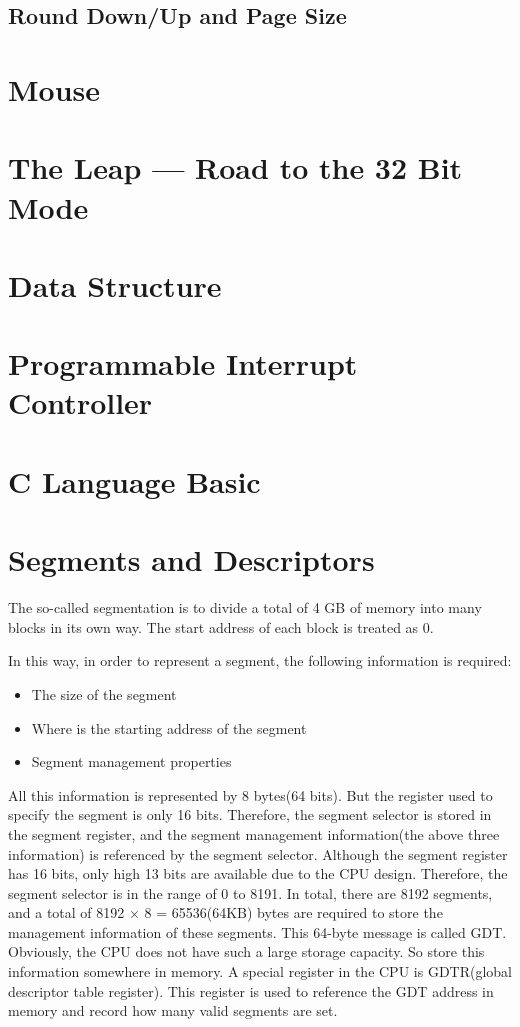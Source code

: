 \documentclass{swfcthesis}
\begin{document}
\subsection{Round Down/Up and Page Size}
\label{sec:round-downup-page}


\section{Mouse}
\label{sec:mouse}

\section{The Leap --- Road to the 32 Bit Mode}
\label{sec:leap-road-32}

\section{Data Structure}
\label{sec:data-structure}

\section{Programmable Interrupt Controller}

\section{C Language Basic}

\section{Segments and Descriptors}
The so-called segmentation is to divide a total of 4 GB of memory into many blocks in its
own way. The start address of each block is treated as 0.

In this way, in order to represent a segment, the following information is required:
\begin{itemize}
\item The size of the segment
\item Where is the starting address of the segment
\item Segment management properties
\end{itemize}

All this information is represented by 8 bytes(64 bits). But the register used to specify
the segment is only 16 bits. Therefore, the segment selector is stored in the segment
register, and the segment management information(the above three information) is
referenced by the segment selector. Although the segment register has 16 bits, only high 13
bits are available due to the CPU design. Therefore, the segment selector is in the range
of 0 to 8191. In total, there are 8192 segments, and a total of 8192 × 8 = 65536(64KB) bytes are
required to store the management information of these segments. This 64-byte message is
called GDT. Obviously, the CPU does not have such a large storage capacity. So store this
information somewhere in memory. A special register in the CPU is GDTR(global descriptor
table register). This register is used to reference the GDT address in memory and record
how many valid segments are set.
\end{document}
